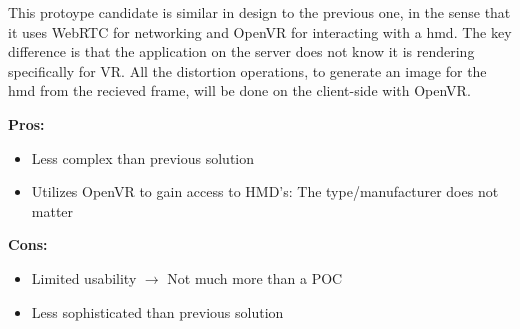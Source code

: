 This protoype candidate is similar in design to the previous one, in the sense that it uses WebRTC for networking and OpenVR for interacting with a \acrshort{hmd}. The key difference is that the application on the server does not know it is rendering specifically for VR. All the distortion operations, to generate an image for the \acrshort{hmd} from the recieved frame, will be done on the client-side with OpenVR. \\
\newline
\begin{varwidth}[t]{.5\textwidth}
\renewcommand\labelitemi{+}
\textbf{Pros:}
\begin{itemize}
\item Less complex than previous solution
\item Utilizes OpenVR to gain access to HMD's: The type/manufacturer does not matter
\end{itemize}
\end{varwidth}
\hspace{4em}
\begin{varwidth}[t]{.5\textwidth}
\renewcommand\labelitemi{-}
\textbf{Cons:}
\begin{itemize}
\item Limited usability $\rightarrow$
Not much more than a POC
\item Less sophisticated than previous solution
\end{itemize}
\end{varwidth}